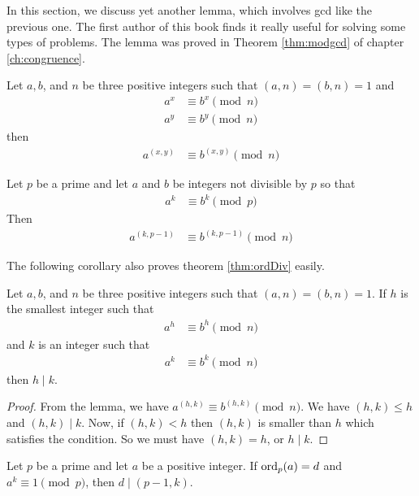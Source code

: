 In this section, we discuss yet another lemma, which involves gcd like the previous one. The first author of this book finds it really useful for solving some types of problems. The lemma was proved in Theorem \eqref{thm:modgcd} of chapter \eqref{ch:congruence}.
	\begin{lemma}
		Let $a, b$, and $n$ be three positive integers such that $(a,n)=(b,n)=1$ and
			\begin{align*}
				a^x &\equiv b^x\pmod n\\
				a^y &\equiv b^y\pmod n
			\end{align*}
		then
			\begin{align*}
				a^{(x,y)} &\equiv b^{(x,y)}\pmod n
			\end{align*}
	\end{lemma}

	\begin{corollary}
		Let $p$ be a prime and let $a$ and $b$ be integers not divisible by $p$ so that
			\begin{align*}
				a^k &\equiv b^k\pmod p
			\end{align*}
		Then
			\begin{align*}
				a^{(k,p-1)} &\equiv b^{(k,p-1)}\pmod n
			\end{align*}
	\end{corollary}

The following corollary also proves theorem \eqref{thm:ordDiv} easily.
	\begin{corollary}
		Let $a, b$, and $n$ be three positive integers such that $(a,n)=(b,n)=1$. If $h$ is the smallest integer such that
			\begin{align*}
				a^h &\equiv b^h\pmod n
			\end{align*}
		and $k$ is an integer such that
			\begin{align*}
				a^k &\equiv b^k\pmod n
			\end{align*}
		then $h\mid k$.
	\end{corollary}

	\begin{proof}
		From the lemma, we have $a^{(h,k)}\equiv b^{(h,k)}\pmod n$. We have $(h,k)\leq h$ and $(h,k)\mid k$. Now, if $(h,k)<h$ then $(h,k)$ is smaller than $h$ which satisfies the condition. So we must have $(h,k)=h$, or $h\mid k$.
	\end{proof}

	\begin{corollary}\label{cor:cor2}
		Let $p$ be a prime and let $a$ be a positive integer. If $\operatorname{ord}_p(a)=d$ and $a^k\equiv1\pmod p$, then $d\mid (p-1,k)$.
	\end{corollary}

